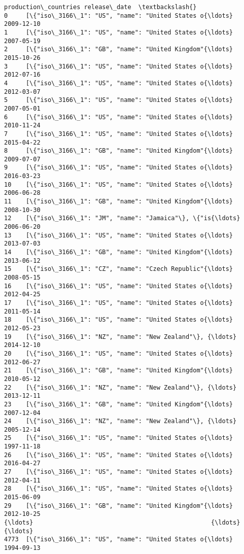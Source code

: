 \documentclass[11pt]{article}
\begin{document}
\begin{Verbatim}[commandchars=\\\{\}]
                                   production\_countries release\_date  \textbackslash{}
0     [\{"iso\_3166\_1": "US", "name": "United States o{\ldots}   2009-12-10   
1     [\{"iso\_3166\_1": "US", "name": "United States o{\ldots}   2007-05-19   
2     [\{"iso\_3166\_1": "GB", "name": "United Kingdom"{\ldots}   2015-10-26   
3     [\{"iso\_3166\_1": "US", "name": "United States o{\ldots}   2012-07-16   
4     [\{"iso\_3166\_1": "US", "name": "United States o{\ldots}   2012-03-07   
5     [\{"iso\_3166\_1": "US", "name": "United States o{\ldots}   2007-05-01   
6     [\{"iso\_3166\_1": "US", "name": "United States o{\ldots}   2010-11-24   
7     [\{"iso\_3166\_1": "US", "name": "United States o{\ldots}   2015-04-22   
8     [\{"iso\_3166\_1": "GB", "name": "United Kingdom"{\ldots}   2009-07-07   
9     [\{"iso\_3166\_1": "US", "name": "United States o{\ldots}   2016-03-23   
10    [\{"iso\_3166\_1": "US", "name": "United States o{\ldots}   2006-06-28   
11    [\{"iso\_3166\_1": "GB", "name": "United Kingdom"{\ldots}   2008-10-30   
12    [\{"iso\_3166\_1": "JM", "name": "Jamaica"\}, \{"is{\ldots}   2006-06-20   
13    [\{"iso\_3166\_1": "US", "name": "United States o{\ldots}   2013-07-03   
14    [\{"iso\_3166\_1": "GB", "name": "United Kingdom"{\ldots}   2013-06-12   
15    [\{"iso\_3166\_1": "CZ", "name": "Czech Republic"{\ldots}   2008-05-15   
16    [\{"iso\_3166\_1": "US", "name": "United States o{\ldots}   2012-04-25   
17    [\{"iso\_3166\_1": "US", "name": "United States o{\ldots}   2011-05-14   
18    [\{"iso\_3166\_1": "US", "name": "United States o{\ldots}   2012-05-23   
19    [\{"iso\_3166\_1": "NZ", "name": "New Zealand"\}, {\ldots}   2014-12-10   
20    [\{"iso\_3166\_1": "US", "name": "United States o{\ldots}   2012-06-27   
21    [\{"iso\_3166\_1": "GB", "name": "United Kingdom"{\ldots}   2010-05-12   
22    [\{"iso\_3166\_1": "NZ", "name": "New Zealand"\}, {\ldots}   2013-12-11   
23    [\{"iso\_3166\_1": "GB", "name": "United Kingdom"{\ldots}   2007-12-04   
24    [\{"iso\_3166\_1": "NZ", "name": "New Zealand"\}, {\ldots}   2005-12-14   
25    [\{"iso\_3166\_1": "US", "name": "United States o{\ldots}   1997-11-18   
26    [\{"iso\_3166\_1": "US", "name": "United States o{\ldots}   2016-04-27   
27    [\{"iso\_3166\_1": "US", "name": "United States o{\ldots}   2012-04-11   
28    [\{"iso\_3166\_1": "US", "name": "United States o{\ldots}   2015-06-09   
29    [\{"iso\_3166\_1": "GB", "name": "United Kingdom"{\ldots}   2012-10-25   
{\ldots}                                                 {\ldots}          {\ldots}   
4773  [\{"iso\_3166\_1": "US", "name": "United States o{\ldots}   1994-09-13   

\end{Verbatim}
\end{document}
